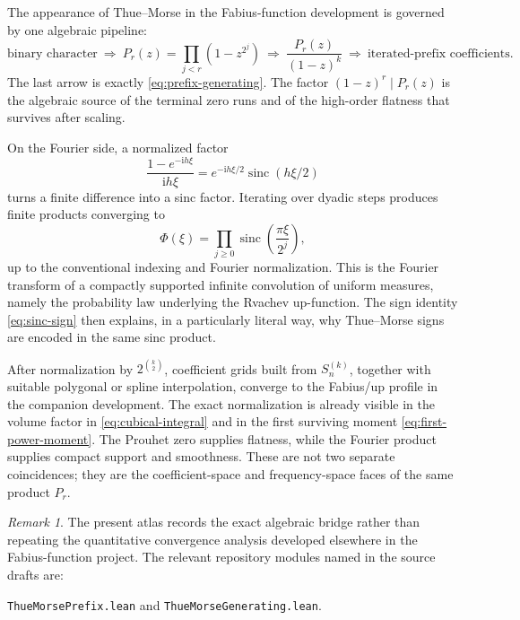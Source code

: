 \documentclass[11pt,oneside]{article}
\numberwithin{equation}{section}
\theoremstyle{definition}
\theoremstyle{remark}
\newtheorem{remark}[theorem]{Remark}
\newcommand{\ii}{\mathrm i}
\newcommand{\sinc}{\operatorname{sinc}}
\begin{document}
The appearance of Thue--Morse in the Fabius-function development is governed
by one algebraic pipeline:
\begin{equation}
 \boxed{\text{binary character}
 \ \Longrightarrow\ P_r(z)=\prod_{j<r}(1-z^{2^j})
 \ \Longrightarrow\ \frac{P_r(z)}{(1-z)^k}
 \ \Longrightarrow\ \text{iterated-prefix coefficients}.}
 \label{eq:fabius-pipeline}
\end{equation}
The last arrow is exactly \eqref{eq:prefix-generating}.  The factor
\((1-z)^r\mid P_r(z)\) is the algebraic source of the terminal zero runs and
of the high-order flatness that survives after scaling.

On the Fourier side, a normalized factor
\[
 \frac{1-e^{-\ii h\xi}}{\ii h\xi}
 =e^{-\ii h\xi/2}\sinc(h\xi/2)
\]
turns a finite difference into a sinc factor.  Iterating over dyadic steps
produces finite products converging to
\begin{equation}
 \Phi(\xi)=\prod_{j\ge0}\sinc\!\left(\frac{\pi\xi}{2^j}\right),
 \label{eq:up-Fourier-product}
\end{equation}
up to the conventional indexing and Fourier normalization.  This is the
Fourier transform of a compactly supported infinite convolution of uniform
measures, namely the probability law underlying the Rvachev up-function.
The sign identity \eqref{eq:sinc-sign} then explains, in a particularly
literal way, why Thue--Morse signs are encoded in the same sinc product.

After normalization by \(2^{\binom{k}{2}}\), coefficient grids built from
\(S_n^{(k)}\), together with suitable polygonal or spline interpolation,
converge to the Fabius/up profile in the companion development.  The exact
normalization is already visible in the volume factor in
\eqref{eq:cubical-integral} and in the first surviving moment
\eqref{eq:first-power-moment}.  The Prouhet zero supplies flatness, while the
Fourier product supplies compact support and smoothness.  These are not two
separate coincidences; they are the coefficient-space and frequency-space
faces of the same product \(P_r\).

\begin{remark}
The present atlas records the exact algebraic bridge rather than repeating the
quantitative convergence analysis developed elsewhere in the Fabius-function
project.  The relevant repository modules named in the source drafts are:
\begin{center}
\texttt{ThueMorsePrefix.lean} \qquad and \qquad
\texttt{ThueMorseGenerating.lean}.
\end{center}
\end{remark}
\end{document}
